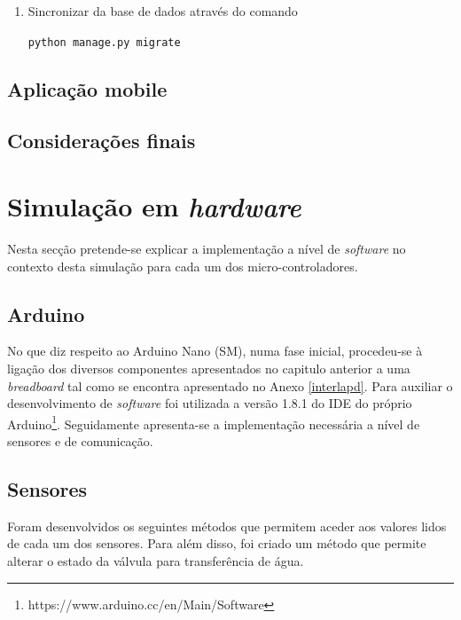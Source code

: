 \begin{enumerate}
	
	\item Sincronizar da base de dados através do comando 
	
	\texttt{python manage.py migrate}
	
	 
	 
	 
\end{enumerate}




\subsection{Aplicação mobile}




\subsection{Considerações finais}





\newpage
\section{Simulação em \textit{hardware}}

Nesta secção pretende-se explicar a implementação a nível de \textit{software} no contexto desta simulação para cada um dos micro-controladores. 


\subsection{Arduino}

No que diz respeito ao Arduino Nano (\acl{SM}), numa fase inicial,  procedeu-se à ligação dos diversos componentes  apresentados no capitulo anterior a uma \textit{breadboard} tal como se encontra apresentado no Anexo \ref{interlapd}. Para auxiliar o desenvolvimento de \textit{software} foi utilizada a versão 1.8.1 do \ac{IDE} do próprio Arduino\footnote{https://www.arduino.cc/en/Main/Software}. Seguidamente apresenta-se a implementação necessária a nível de sensores e de comunicação. 

\subsection{Sensores}



Foram desenvolvidos os seguintes métodos que permitem aceder aos valores lidos de cada um dos sensores. Para além disso, foi criado um método que permite alterar o estado da válvula para transferência de água. 

